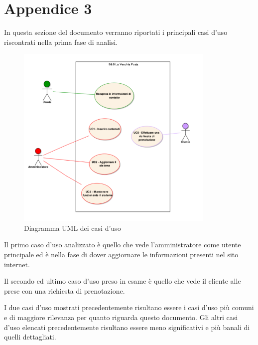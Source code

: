 \documentclass[a4paper,12pt,hidelinks]{report}
\begin{document}
\section{Appendice 3}
\label{sec:appendice3}
In questa sezione del documento verranno riportati i principali casi d'uso riscontrati nella prima fase di analisi.
\begin{figure}[h!]%
    \includegraphics[width=0.85\textwidth,keepaspectratio=true]{../img/useCase}
    \centering
    \caption{Diagramma UML dei casi d'uso}%
    \label{fig:useCase}%
  \end{figure}
  \newpage
Il primo caso d'uso analizzato è quello che vede l'amministratore come utente principale ed è nella fase di dover aggiornare le informazioni presenti nel sito internet.
  
Il secondo ed ultimo caso d'uso preso in esame è quello che vede il cliente alle prese con una richiesta di prenotazione.
  
\par I due casi d'uso mostrati precedentemente risultano essere i casi d'uso più comuni e di maggiore rilevanza per quanto riguarda questo documento. Gli altri casi d'uso 
elencati precedentemente risultano essere meno significativi e più banali di quelli dettagliati.
\newpage
\end{document}
